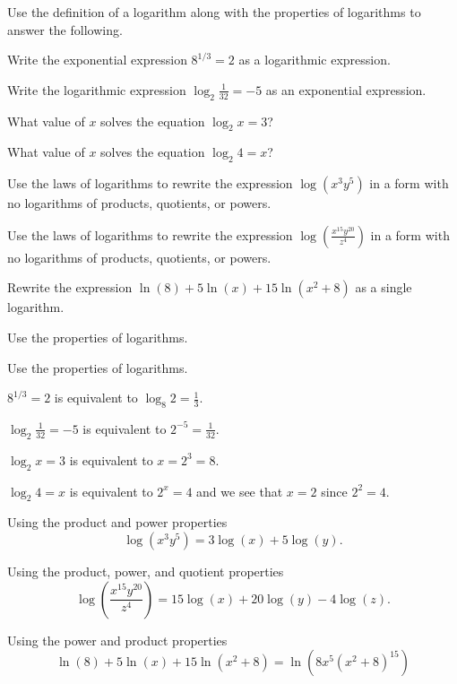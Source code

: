 \begin{activity}\label{A:0.4.1}
    Use the definition of a logarithm along with the properties of logarithms to answer
    the following.
    \ba
\item Write the exponential expression $8^{1/3} = 2$ as a logarithmic expression.
\item Write the logarithmic expression $\log_2 \frac{1}{32} = -5$ as an exponential
    expression.
\item What value of $x$ solves the equation $\log_2 x = 3$?
\item What value of $x$ solves the equation $\log_2 4 = x$?
\item Use the laws of logarithms to rewrite the expression $\log \left( x^3 y^5 \right)$
    in a form with no logarithms of products, quotients, or powers.
\item Use the laws of logarithms to rewrite the expression $\log \left( \frac{x^{15}
    y^{20}}{z^4} \right)$
    in a form with no logarithms of products, quotients, or powers.
\item Rewrite the expression $\ln(8) + 5 \ln(x) + 15 \ln(x^2+8)$ as a single logarithm.
    \ea


\end{activity}
\begin{smallhint}
    Use the properties of logarithms.
\end{smallhint}
\begin{bighint}
    Use the properties of logarithms.
\end{bighint}
\begin{activitySolution}
    \ba
\item $8^{1/3} = 2$ is equivalent to $\log_8 2 = \frac{1}{3}$.
\item $\log_2 \frac{1}{32} = -5$ is equivalent to $2^{-5} = \frac{1}{32}$.
\item $\log_2 x = 3$ is equivalent to $x = 2^3 = 8$.
\item $\log_2 4 = x$ is equivalent to $2^x = 4$ and we see that $x=2$ since $2^2 = 4$.
\item Using the product and power properties
    \[ \log\left( x^3 y^5 \right) = 3\log(x) + 5\log(y). \]
\item Using the product, power, and quotient properties
    \[ \log\left( \frac{x^{15} y^{20}}{z^4} \right) = 15\log(x) + 20\log(y) - 4\log(z). \]
\item Using the power and product properties
    \[ \ln(8) + 5 \ln(x) + 15\ln(x^2+8) = \ln\left( 8 x^5 \left( x^2 + 8 \right)^{15}
        \right) \]
    \ea
\end{activitySolution}

\aftera

